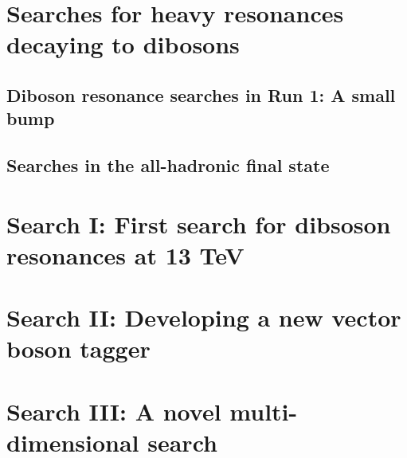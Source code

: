 \section{Searches for heavy resonances decaying to dibosons}
    \subsection{Diboson resonance searches in Run 1: A small bump}
    \subsection{Searches in the all-hadronic final state}
\section{Search I: First search for dibsoson resonances at 13 TeV}
\section{Search II: Developing a new vector boson tagger}
\section{Search III: A novel multi-dimensional search}
